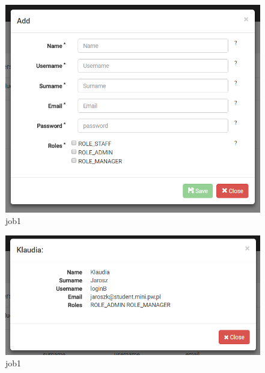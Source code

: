 \documentclass[a4paper,11pt,twoside]{report}
\theoremstyle{definition}
\begin{document}
\begin{figure}[h!]
\begin{center}
\includegraphics[width=\textwidth]{AS/users/2}
\end{center}
\caption{job1}
\end{figure}
\thispagestyle{empty}


\begin{figure}[h!]
\begin{center}
\includegraphics[width=\textwidth]{AS/users/3}
\end{center}
\caption{job1}
\end{figure}
\thispagestyle{empty}
\end{document}
